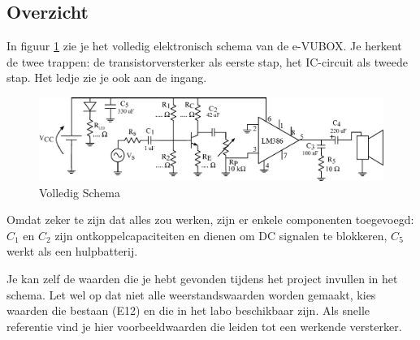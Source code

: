 \documentclass{article}
\begin{document}
	\begin{landscape}
		\section{Overzicht}
				In figuur \ref{fig:volledig_schema} zie je het volledig elektronisch schema van de e-VUBOX. Je herkent de twee trappen: de transistorversterker als eerste stap, het IC-circuit als tweede stap. Het ledje zie je ook aan de ingang.
				\begin{figure}[htbp]
					\centering
					\includegraphics[width=\linewidth]{volledig_schema}
					\caption{Volledig Schema}
					\label{fig:volledig_schema}
				\end{figure}
				Omdat zeker te zijn dat alles zou werken, zijn er enkele componenten toegevoegd: $C_1$ en $C_2$ zijn ontkoppelcapaciteiten en dienen om DC signalen te blokkeren, $C_5$ werkt als een hulpbatterij.

				Je kan zelf de waarden die je hebt gevonden tijdens het project invullen in het schema. Let wel op dat niet alle weerstandswaarden worden gemaakt, kies waarden die bestaan (E12) en die in het labo beschikbaar zijn.
				Als snelle referentie vind je hier voorbeeldwaarden die leiden tot een werkende versterker.

				\begin{center}
					\noindent {}
				\end{center}

	\end{landscape}
\end{document}
